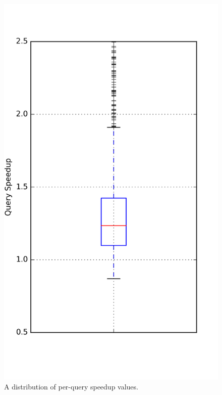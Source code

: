 \documentclass{article}
\begin{document}
\begin{figure}[h]
  \includegraphics[width=\textwidth]{figures/empirical_comparison/query_speedup_box_plot.png}
  \caption{A distribution of per-query speedup values.}
  \label{fig:query_speedup_box_plot}
\end{figure}

\printbibliography
\end{document}
